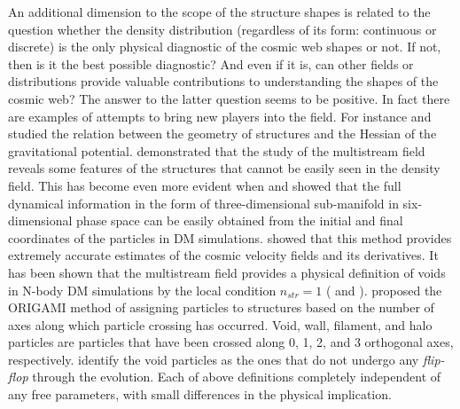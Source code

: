 An additional dimension to the scope of the structure shapes is related to the question whether the density distribution (regardless of its form: continuous or discrete) is the only physical diagnostic of the cosmic web shapes or not. If not, then is it the best possible diagnostic? And even if it is, can other fields or distributions provide valuable contributions to understanding the shapes of the cosmic web? The answer to the latter question seems to be positive. In fact there are examples of attempts to bring new players into the field. For instance \cite{Hahn2007} and \cite{Forero-Romero2009a} studied the relation between the geometry of structures and the Hessian of the gravitational potential. \cite{Shandarin2011} demonstrated that the study of the multistream field reveals some features of the structures that cannot be easily seen in the density field. This has become even more evident when \cite{Shandarin2012} and \cite{Abel2012} showed that the full dynamical information in the form of three-dimensional  sub-manifold in six-dimensional phase space can be easily obtained from the  initial and final coordinates of the particles in DM simulations. \cite{Hahn2015a} showed that this method provides extremely accurate estimates of the cosmic velocity fields and its derivatives. It has been shown that the multistream field provides a physical definition of voids in N-body DM simulations by the local condition $n_{str} = 1$ (\citealt{Shandarin2012} and \citealt{Ramachandra2015}). \cite{Falck2012} proposed the {ORIGAMI} method of assigning particles to  structures based on the number of axes along which particle crossing has occurred. Void, wall, filament, and halo particles are particles that have been crossed along 0, 1, 2, and 3 orthogonal axes, respectively. \cite{Shandarin2016} identify the void particles as the ones that do not undergo any {\it flip-flop} through the evolution. Each of above definitions completely independent of any free parameters, with small differences in the physical implication.




